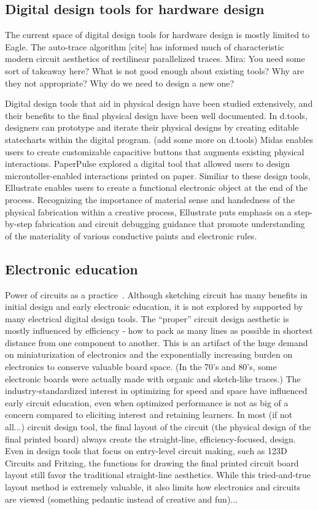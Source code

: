 \documentclass{sigchi}
\begin{document}
\subsection{Digital design tools for hardware design }
The current space of digital design tools for hardware design is mostly limited to Eagle. The auto-trace algorithm [cite] has informed much of characteristic modern circuit aesthetics of rectilinear parallelized traces. Mira: You need some sort of takeaway here? What is not good enough about existing tools? Why are they not appropriate? Why do we need to design a new one?

Digital design tools that aid in physical design have been studied extensively, and their benefits to the final physical design have been well documented. In d.tools,  designers can prototype and iterate their physical designs by creating editable statecharts within the digital program. (add some more on d.tools) Midas enables users to create customizable capacitive buttons that augments existing physical interactions. PaperPulse explored a digital tool that allowed users to design microntoller-enabled interactions printed on paper. Similiar to these design tools, Ellustrate enables users to create a functional electronic object at the end of the process. Recognizing the importance of material sense and handedness of the physical fabrication within a creative process, Ellustrate puts emphasis on a step-by-step fabrication and circuit debugging guidance that promote understanding of the materiality of various conductive paints and electronic rules. 


\subsection{Electronic education}
Power of circuits as a practice~\cite{collins_solders_2008}.
Although sketching circuit has many benefits in initial design and early electronic education, it is not explored by supported by many electrical digital design tools. The “proper” circuit design aesthetic is mostly influenced by efficiency - how to pack as many lines as possible in shortest distance from one component to another. This is an artifact of the huge demand on miniaturization of electronics and the exponentially increasing burden on electronics to conserve valuable board space. (In the 70’s and 80’s, some electronic boards were actually made with organic and sketch-like traces.) The industry-standardized interest in optimizing for speed and space have influenced early circuit education, even when optimized performance is not as big of a concern compared to eliciting interest and retaining learners. In most (if not all...) circuit design tool, the final layout of the circuit (the physical design of the final printed board) always create the straight-line, efficiency-focused, design. Even in design tools that focus on entry-level circuit making, such as 123D Circuits and Fritzing, the functions for drawing the final printed circuit board layout still favor the traditional straight-line aesthetics. While this tried-and-true layout method is extremely valuable, it also limits how electronics and circuits are viewed (something pedantic instead of creative and fun)...
\end{document}
